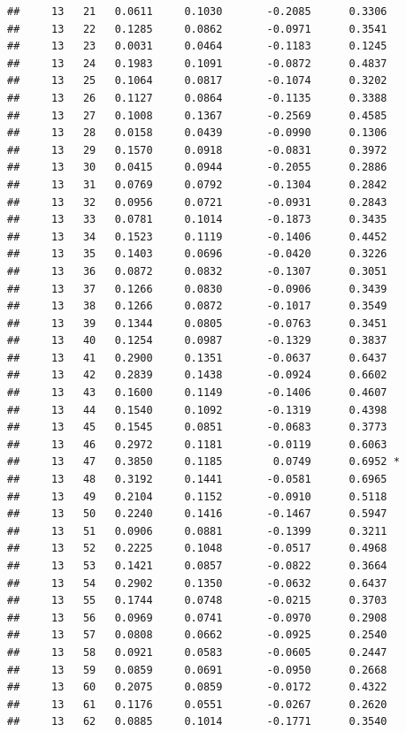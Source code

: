 \documentclass[
]{article}
\begin{document}
\begin{verbatim}
##     13   21   0.0611     0.1030       -0.2085      0.3306  
##     13   22   0.1285     0.0862       -0.0971      0.3541  
##     13   23   0.0031     0.0464       -0.1183      0.1245  
##     13   24   0.1983     0.1091       -0.0872      0.4837  
##     13   25   0.1064     0.0817       -0.1074      0.3202  
##     13   26   0.1127     0.0864       -0.1135      0.3388  
##     13   27   0.1008     0.1367       -0.2569      0.4585  
##     13   28   0.0158     0.0439       -0.0990      0.1306  
##     13   29   0.1570     0.0918       -0.0831      0.3972  
##     13   30   0.0415     0.0944       -0.2055      0.2886  
##     13   31   0.0769     0.0792       -0.1304      0.2842  
##     13   32   0.0956     0.0721       -0.0931      0.2843  
##     13   33   0.0781     0.1014       -0.1873      0.3435  
##     13   34   0.1523     0.1119       -0.1406      0.4452  
##     13   35   0.1403     0.0696       -0.0420      0.3226  
##     13   36   0.0872     0.0832       -0.1307      0.3051  
##     13   37   0.1266     0.0830       -0.0906      0.3439  
##     13   38   0.1266     0.0872       -0.1017      0.3549  
##     13   39   0.1344     0.0805       -0.0763      0.3451  
##     13   40   0.1254     0.0987       -0.1329      0.3837  
##     13   41   0.2900     0.1351       -0.0637      0.6437  
##     13   42   0.2839     0.1438       -0.0924      0.6602  
##     13   43   0.1600     0.1149       -0.1406      0.4607  
##     13   44   0.1540     0.1092       -0.1319      0.4398  
##     13   45   0.1545     0.0851       -0.0683      0.3773  
##     13   46   0.2972     0.1181       -0.0119      0.6063  
##     13   47   0.3850     0.1185        0.0749      0.6952 *
##     13   48   0.3192     0.1441       -0.0581      0.6965  
##     13   49   0.2104     0.1152       -0.0910      0.5118  
##     13   50   0.2240     0.1416       -0.1467      0.5947  
##     13   51   0.0906     0.0881       -0.1399      0.3211  
##     13   52   0.2225     0.1048       -0.0517      0.4968  
##     13   53   0.1421     0.0857       -0.0822      0.3664  
##     13   54   0.2902     0.1350       -0.0632      0.6437  
##     13   55   0.1744     0.0748       -0.0215      0.3703  
##     13   56   0.0969     0.0741       -0.0970      0.2908  
##     13   57   0.0808     0.0662       -0.0925      0.2540  
##     13   58   0.0921     0.0583       -0.0605      0.2447  
##     13   59   0.0859     0.0691       -0.0950      0.2668  
##     13   60   0.2075     0.0859       -0.0172      0.4322  
##     13   61   0.1176     0.0551       -0.0267      0.2620  
##     13   62   0.0885     0.1014       -0.1771      0.3540  

\end{verbatim}
\end{document}

